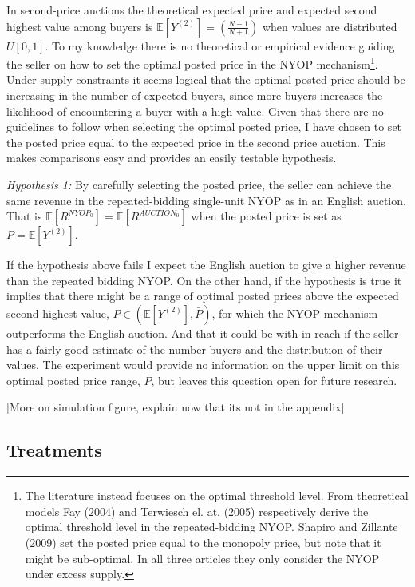 \documentclass[a4paper,12pt]{article}
\begin{document}
	In second-price auctions the theoretical expected price and expected second highest value among buyers is $\mathbb{E}[Y^{(2)}] = (\frac{N-1}{N+1})$ when values are distributed $U[0,1]$. To my knowledge there is no theoretical or empirical evidence guiding the seller on how to set the optimal posted price in the NYOP mechanism\footnote{The literature instead focuses on the optimal threshold level. From theoretical models Fay (2004) and Terwiesch el. at. (2005) respectively derive the optimal threshold level in the repeated-bidding NYOP. Shapiro and Zillante (2009) set the posted price equal to the monopoly price, but note that it might be sub-optimal. In all three articles they only consider the NYOP under excess supply.}. Under supply constraints it seems logical that the optimal posted price should be increasing in the number of expected buyers, since more buyers increases the likelihood of encountering a buyer with a high value. Given that there are no guidelines to follow when selecting the optimal posted price, I have chosen to set the posted price equal to the expected price in the second price auction. This makes comparisons easy and provides an easily testable hypothesis.

	\emph{Hypothesis 1:} By carefully selecting the posted price, the seller can achieve the same revenue in the repeated-bidding single-unit NYOP as in an English auction. That is $\mathbb{E}[R^{NYOP_0}] = \mathbb{E}[R^{AUCTION_0}]$ when the posted price is set as $P = \mathbb{E}[Y^{(2)}]$.
	
	If the hypothesis above fails I expect the English auction to give a higher revenue than the repeated bidding NYOP. On the other hand, if the hypothesis is true it implies that there might be a range of optimal posted prices above the expected second highest value, $P \in (\mathbb{E}[Y^{(2)}], \bar{P})$, for which the NYOP mechanism outperforms the English auction. And that it could be with in reach if the seller has a fairly good estimate of the number buyers and the distribution of their values. The experiment would provide no information on the upper limit on this optimal posted price range, $\bar{P}$, but leaves this question open for future research.
	
	[More on simulation figure, explain now that its not in the appendix]

	\subsection{Treatments}
	\label{sec:treatments}
\end{document}
